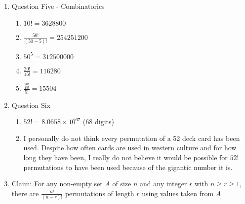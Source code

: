 \documentclass{article}
\begin{document}
\begin{enumerate}
\begin{proof}
\begin{align}
            &\hspace{1cm} \text{Since } \left (\frac{n}{2}\right )^{\frac{n}{2}} \geq \left (\frac{m}{2}\right )^{\frac{n}{2}} \text{, we know } n! > \left (\frac{m}{2}\right )^{\frac{n}{2}} \\
            &\hspace{1cm} \text{Since } \left (\frac{m}{2}\right )^{\frac{n}{2}} = \left (\sqrt{\frac{m}{2}}\right )^{n} \text{, we know } n! > \left (\sqrt{\frac{m}{2}}\right )^{n} \\
            &\hspace{1cm} \text{Since } m > 2a^2 \text{, we know } \frac{m}{2} > a^2 \\
            &\hspace{1cm} \text{Since } \frac{m}{2} > a^2 \text{, we know } \sqrt{\frac{m}{2}} > a \\
            &\hspace{1cm} \text{Since } \sqrt{\frac{m}{2}} > a \text{, we know } \left (\sqrt{\frac{m}{2}}\right )^n > a^n \\
            &\hspace{1cm} \text{Since } \left (\sqrt{\frac{m}{2}}\right )^n > a^n \text{, we know } n! > a^n
        \end{align}
    \end{proof}
    \item Question Five - Combinatorics
    \begin{enumerate}
        \item $10! = 3628800$
        \item $\frac{50!}{(50-5)!} = 254251200$
        \item $50^5 = 312500000$
        \item $\frac{20!}{16!} = 116280$
        \item $\frac{\frac{20!}{15!}}{5!} = 15504$
    \end{enumerate}
    \item Question Six
    \begin{enumerate}
        \item $52! = 8.0658 \times 10^{67}$ ($68$ digits)
        \item I personally do not think every permutation of a 52 deck card has been used. Despite how often cards are used in western culture and for how long they have been, I really do not believe it would be possible for $52!$ permutations to have been used because of the gigantic number it is.
    \end{enumerate}
    \item Claim: For any non-empty set $A$ of size $n$ and any integer $r$ with $n \geq r \geq 1$, there are $\frac{n!}{(n-r)!}$ permutations of length $r$ using values taken from $A$

\end{enumerate}
\end{document}
